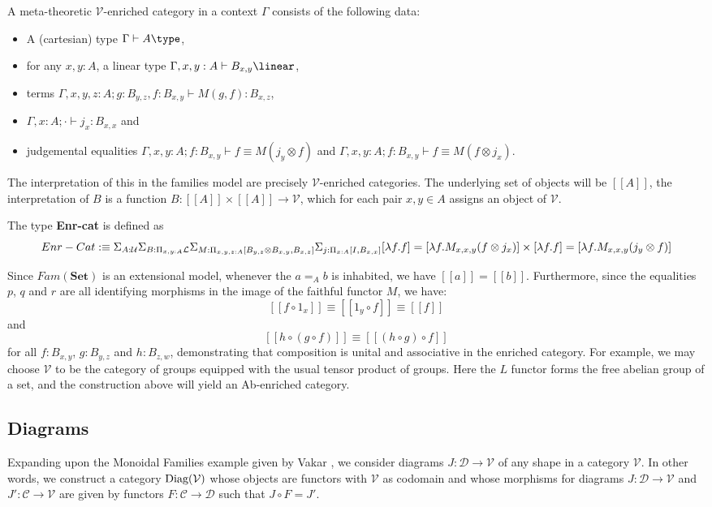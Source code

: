 \begin{defn}
  A meta-theoretic $\mathcal{V}$-enriched category in a context $\Gamma$ consists of the following data:
 \begin{itemize}
\item A (cartesian) type $\Gamma \vdash A \type$,
\item for any $x, y : A$, a linear type $\Gamma, x, y : A \vdash B_{x, y} \linear$,
\item terms $\Gamma, x, y, z : A; g: B_{y, z}, f:  B_{x, y} \vdash M(g, f) : B_{x, z}$,
\item $\Gamma, x : A; \cdot \vdash j_x : B_{x, x}$ and
\item judgemental equalities $\Gamma, x, y : A; f : B_{x, y} \vdash f \equiv M(j_y \otimes f)$ and $\Gamma, x, y : A; f : B_{x, y} \vdash f \equiv M(f \otimes j_x)$.
\end{itemize}
\end{defn}
The interpretation of this in the families model are precisely $\mathcal{V}$-enriched categories. The underlying set of objects will be $[[A]]$, the interpretation of $B$ is a function $B : [[A]] \times [[A]] \to \mathcal{V}$, which for each pair $x, y \in A$ assigns an object of $\mathcal{V}$. 
\begin{defn}
  The type \textbf{Enr-cat} is defined as
  \[
    Enr-Cat :\equiv \Sigma_{A : \mathcal{U}} \Sigma_{B : \Pi_{x, y : A}\mathcal{L}} \Sigma_{M : \Pi_{x, y, z : A} [B_{y, z} \otimes B_{x, y}, B_{x,z}]} \Sigma_{j : \Pi_{x: A}[I, B_{x, x}]}[\lambda f. f] = [\lambda f. M_{x, x, y}(f \otimes j_x)] \times [\lambda f. f] = [\lambda f. M_{x, x, y}(j_y \otimes f)] \\
  \]
\end{defn}
Since $Fam(\mathbf{Set})$ is an extensional model, whenever the $a =_A b$ is inhabited, we have $[[a]]=[[b]]$. Furthermore, since the equalities $p$, $q$ and $r$ are all identifying morphisms in the image of the faithful functor $M$, we have:
\[
[[f \circ 1_x ]] \equiv [[1_y \circ f]] \equiv [[f]]
\]
and
\[
[[h \circ (g \circ f)]] \equiv [[(h \circ g) \circ f]]
\]
for all $f : B_{x,y}$, $g : B_{y,z}$ and $h : B_{z,w}$, demonstrating that composition is unital and associative in the enriched category.
For example, we may choose $\mathcal{V}$ to be the category of groups equipped with the usual tensor product of groups. Here the $L$ functor forms the free abelian group of a set, and the construction above will yield an Ab-enriched category.
\subsection{Diagrams}
Expanding upon the Monoidal Families example given by Vakar \cite{vakar14}, we consider diagrams $J : \mathcal{D} \to \mathcal{V}$ of any shape in a category $\mathcal{V}$. In other words, we construct a category $\operatorname{\text{Diag}}(\mathcal{V})$ whose objects are functors with $\mathcal{V}$ as codomain and whose morphisms for diagrams $J : \mathcal{D} \to \mathcal{V}$ and $J' :\mathcal{C} \to \mathcal{V}$ are given by functors $F : \mathcal{C} \to \mathcal{D}$ such that $J \circ F = J'$.

